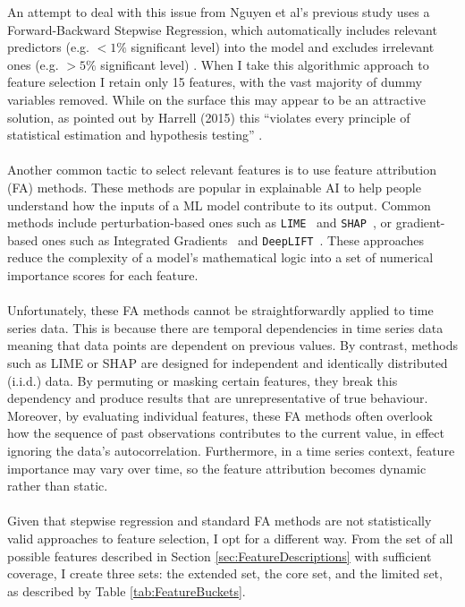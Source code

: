 \documentclass[12pt,twoside]{report}
\begin{document}
An attempt to deal with this issue from Nguyen et al's previous study uses a Forward-Backward Stepwise Regression, which automatically includes relevant predictors (e.g. $<1\%$ significant level) into the model and excludes irrelevant ones (e.g. $>5\%$ significant level) \cite{Nguyenetal2023}. When I take this algorithmic approach to feature selection I retain only 15 features, with the vast majority of dummy variables removed. While on the surface this may appear to be an attractive solution, as pointed out by Harrell (2015) this ``violates every principle of statistical estimation and hypothesis testing'' \cite{Harrell2015}.
\\\\
Another common tactic to select relevant features is to use feature attribution (FA) methods. These methods are popular in explainable AI to help people understand how the inputs of a ML model contribute to its output. Common methods include perturbation-based ones such as \texttt{LIME}~\cite{ribeiro2016why} and \texttt{SHAP}~\cite{lundberg2017unified}, or gradient-based ones such as Integrated Gradients~\cite{sundararajan2017axiomatic} and \texttt{DeepLIFT}~\cite{shrikumar2019learning}. These approaches reduce the complexity of a model's mathematical logic into a set of numerical importance scores for each feature. 
\\\\
Unfortunately, these FA methods cannot be straightforwardly applied to time series data. This is because there are temporal dependencies in time series data meaning that data points are dependent on previous values. By contrast, methods such as LIME or SHAP are designed for independent and identically distributed (i.i.d.) data. By permuting or masking certain features, they break this dependency and produce results that are unrepresentative of true behaviour. 
\\
Moreover, by evaluating individual features, these FA methods often overlook how the sequence of past observations contributes to the current value, in effect ignoring the data's autocorrelation. Furthermore, in a time series context, feature importance may vary over time, so the feature attribution becomes dynamic rather than static.  
\\\\
Given that stepwise regression and standard FA methods are not statistically valid approaches to feature selection, I opt for a different way. From the set of all possible features described in Section \ref{sec:FeatureDescriptions} with sufficient coverage, I create three sets: the extended set, the core set, and the limited set, as described by Table \ref{tab:FeatureBuckets}. 
\end{document}
